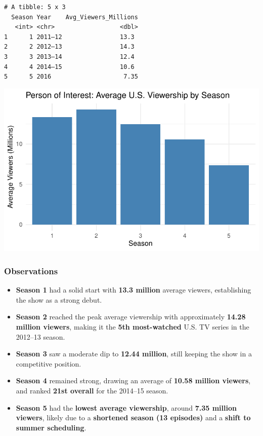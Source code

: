 \documentclass[
  letterpaper,
  DIV=11,
  numbers=noendperiod]{scrartcl}
\providecommand{\tightlist}{%
  \setlength{\itemsep}{0pt}\setlength{\parskip}{0pt}}\usepackage{longtable,booktabs,array}
\begin{document}
\begin{verbatim}
# A tibble: 5 x 3
  Season Year    Avg_Viewers_Millions
   <int> <chr>                  <dbl>
1      1 2011–12                13.3 
2      2 2012–13                14.3 
3      3 2013–14                12.4 
4      4 2014–15                10.6 
5      5 2016                    7.35
\end{verbatim}

\includegraphics{PoI_files/figure-pdf/unnamed-chunk-1-1.pdf}

\subsubsection{Observations}

\begin{itemize}
\tightlist
\item
  \textbf{Season 1} had a solid start with \textbf{13.3 million} average
  viewers, establishing the show as a strong debut.
\item
  \textbf{Season 2} reached the peak average viewership with
  approximately \textbf{14.28 million viewers}, making it the
  \textbf{5th most-watched} U.S. TV series in the 2012--13 season.
\item
  \textbf{Season 3} saw a moderate dip to \textbf{12.44 million}, still
  keeping the show in a competitive position.
\item
  \textbf{Season 4} remained strong, drawing an average of \textbf{10.58
  million viewers}, and ranked \textbf{21st overall} for the 2014--15
  season.
\item
  \textbf{Season 5} had the \textbf{lowest average viewership}, around
  \textbf{7.35 million viewers}, likely due to a \textbf{shortened
  season (13 episodes)} and a \textbf{shift to summer scheduling}.
\end{itemize}
\end{document}
